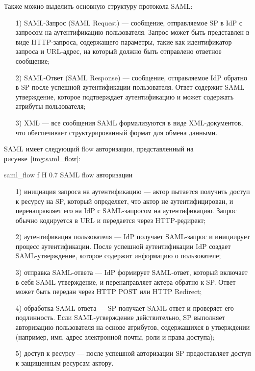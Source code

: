 Также можно выделить основную структуру протокола SAML:
 \begin{enumerate}
  \item[1)] SAML-Запрос (SAML Request) --- сообщение, отправляемое SP в IdP с запросом на аутентификацию пользователя. Запрос может быть представлен в виде HTTP-запроса, содержащего параметры, такие как идентификатор запроса и URL-адрес, на который должно быть отправлено ответное сообщение;
  \item[2)] SAML-Ответ (SAML Response) --- сообщение, отправляемое IdP обратно в SP после успешной аутентификации пользователя. Ответ содержит SAML-утверждение, которое подтверждает аутентификацию и может содержать атрибуты пользователя;
  \item[3)] XML --- все сообщения SAML формализуются в виде XML-документов, что обеспечивает  структурированный формат для обмена данными.
\end{enumerate}

SAML имеет следующий flow авторизации, представленный на рисунке~\ref{img:saml_flow}:

    {saml_flow}
    {f}
    {H}
    {0.7\textwidth}
    {SAML flow авторизации}


 \begin{enumerate}
  \item[1)] инициация запроса на аутентификацию --- актор пытается получить доступ к ресурсу на SP, который определяет, что актор не аутентифицирован, и перенаправляет его на IdP с SAML-запросом на аутентификацию. Запрос обычно кодируется в URL и передается через HTTP-редирект;
  \item[2)] аутентификация пользователя --- IdP получает SAML-запрос и инициирует процесс аутентификации. После успешной аутентификации IdP создает SAML-утверждение, которое содержит информацию о пользователе;
  \item[3)] отправка SAML-ответа --- IdP формирует SAML-ответ, который включает в себя SAML-утверждение, и перенаправляет актера обратно к SP. Ответ может быть передан через HTTP POST или HTTP Redirect;
  \item[4)] обработка SAML-ответа --- SP получает SAML-ответ и проверяет его подлинность. Если SAML-утверждение действительно, SP выполняет авторизацию пользователя на основе атрибутов, содержащихся в утверждении (например, имя, адрес электронной почты, роли и права доступа);
  \item[5)] доступ к ресурсу --- после успешной авторизации SP предоставляет доступ к защищенным ресурсам актору.~\cite{saml}
\end{enumerate}


